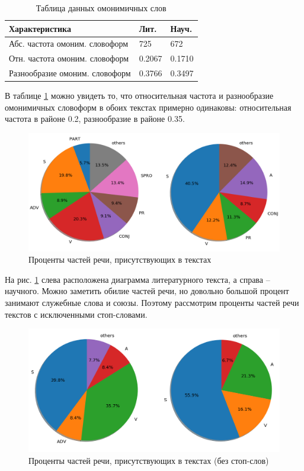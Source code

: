 \documentclass[12pt]{article}
\begin{document}
\begin{table}[h!]
\centering
\begin{tabular}{ |p{7cm}||p{3cm}|p{3cm}| }
 \hline
 Характеристика& Лит. &Науч.\\
 \hline
 Абс. частота омоним. словоформ & 725 & 672\\
 Отн. частота омоним. словоформ & 0.2067 & 0.1710 \\
 Разнообразие омоним. словоформ & 0.3766 & 0.3497 \\
 \hline
\end{tabular}
\caption{Таблица данных омонимичных слов}
\label{table:3}
\end{table}

В таблице \ref{table:3} можно увидеть то, что относительная частота и разнообразие омонимичных словоформ в обоих текстах примерно одинаковы: относительная частота в районе 0.2, разнообразие в районе 0.35.

\begin{figure}[h!]
\includegraphics[width=\textwidth]{images/02.png}
\caption{Проценты частей речи, присутствующих в текстах}
\label{image:1}
\end{figure}

На рис. \ref{image:1} слева расположена диаграмма литературного текста, а справа -- научного. Можно заметить обилие частей речи, но довольно большой процент занимают служебные слова и союзы. Поэтому рассмотрим проценты частей речи текстов с исключенными стоп-словами.

\begin{figure}[h!]
\includegraphics[width=\textwidth]{images/03.png}
\caption{Проценты частей речи, присутствующих в текстах (без стоп-слов)}
\label{image:2}
\end{figure}
\end{document}
